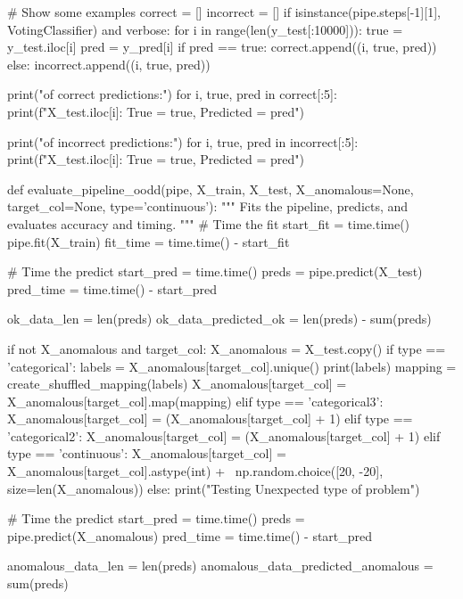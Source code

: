 {{    # Show some examples
    correct = []
    incorrect = []
    if isinstance(pipe.steps[-1][1], VotingClassifier) and verbose:
        for i in range(len(y_test[:10000])):
            true = y_test.iloc[i]
            pred = y_pred[i]
            if pred == true:
                correct.append((i, true, pred))
            else:
                incorrect.append((i, true, pred))

        print("\nExamples of correct predictions:")
        for i, true, pred in correct[:5]:
            print(f"{X_test.iloc[i]}: True = {true}, Predicted = {pred}")

        print("\nExamples of incorrect predictions:")
        for i, true, pred in incorrect[:5]:
            print(f"{X_test.iloc[i]}: True = {true}, Predicted = {pred}")


def evaluate_pipeline_oodd(pipe, X_train, X_test, X_anomalous=None, target_col=None, type='continuous'):
    """
    Fits the pipeline, predicts, and evaluates accuracy and timing.
    """
    # Time the fit
    start_fit = time.time()
    pipe.fit(X_train)
    fit_time = time.time() - start_fit

    # Time the predict
    start_pred = time.time()
    preds = pipe.predict(X_test)
    pred_time = time.time() - start_pred

    ok_data_len = len(preds)
    ok_data_predicted_ok = len(preds) - sum(preds)

    if not X_anomalous and target_col:
        X_anomalous = X_test.copy()
        if type == 'categorical':
            labels = X_anomalous[target_col].unique()
            print(labels)
            mapping = create_shuffled_mapping(labels)
            X_anomalous[target_col] = X_anomalous[target_col].map(mapping)
        elif type == 'categorical3':
            X_anomalous[target_col] = (X_anomalous[target_col] + 1) %
        elif type == 'categorical2':
            X_anomalous[target_col] = (X_anomalous[target_col] + 1) %
        elif type == 'continuous':
            X_anomalous[target_col] = X_anomalous[target_col].astype(int) + \
                np.random.choice([20, -20], size=len(X_anomalous))
        else:
            print("Testing Unexpected type of problem")

        # Time the predict
    start_pred = time.time()
    preds = pipe.predict(X_anomalous)
    pred_time = time.time() - start_pred

    anomalous_data_len = len(preds)
    anomalous_data_predicted_anomalous = sum(preds)

}}
